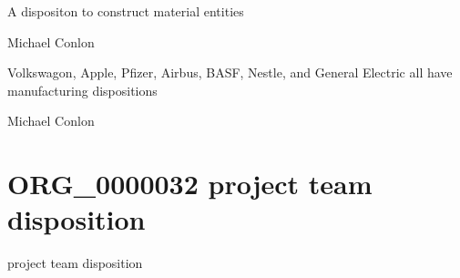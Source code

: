 \documentclass[letterpaper,10pt,english]{sphinxmanual}
\begin{document}
\begin{sphinxShadowBox}

\sphinxAtStartPar
A dispositon to construct material entities
\end{sphinxShadowBox}

\begin{sphinxShadowBox}

\sphinxAtStartPar
Michael Conlon 
\end{sphinxShadowBox}

\begin{sphinxShadowBox}

\sphinxAtStartPar
Volkswagon, Apple, Pfizer, Airbus, BASF, Nestle, and General Electric all have manufacturing dispositions
\end{sphinxShadowBox}

\begin{sphinxShadowBox}

\sphinxAtStartPar
{}
\end{sphinxShadowBox}

\begin{sphinxShadowBox}

\sphinxAtStartPar
Michael Conlon 
\end{sphinxShadowBox}

\begin{sphinxShadowBox}

\sphinxAtStartPar
{}
\end{sphinxShadowBox}
\begin{quote}
\label{\detokenize{doc-ORG_0000032:org-0000032}}\label{\detokenize{doc-ORG_0000032:project-team-disposition}}\label{\detokenize{doc-ORG_0000032:org-0000032}}
\ignorespaces \end{quote}


\section{ORG\_0000032 \sphinxhyphen{} project team disposition}
\label{\detokenize{doc-ORG_0000032:org-0000032-project-team-disposition}}\label{\detokenize{doc-ORG_0000032:index-0}}\label{\detokenize{doc-ORG_0000032::doc}}
\begin{sphinxShadowBox}

\sphinxAtStartPar
project team disposition
\end{sphinxShadowBox}
\end{document}
